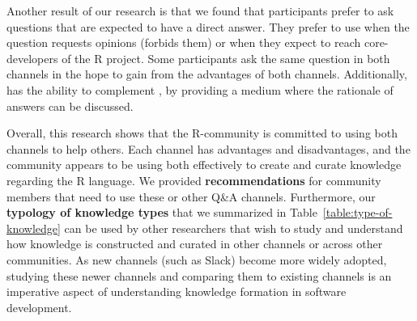 Another result of our research is that we found that participants prefer \SO to ask questions that are expected to have a direct answer. They prefer to use \RH when the
question requests opinions (\SO forbids them) or when they expect to reach core-developers of the R project. Some participants ask the same question in both
channels in the hope to gain from the advantages of both channels. Additionally, \RH has the ability to complement \SO, by providing a medium where the rationale
of answers can be discussed.

Overall, this research shows that the R-community is committed to using both channels to help others. Each channel has advantages and disadvantages, and the
community appears to be using both effectively to create and curate knowledge regarding the R language.  We provided \textbf{recommendations} for community members that need to use these or other Q\&A channels.  Furthermore, our \textbf{typology of knowledge types} that we summarized in Table~\ref{table:type-of-knowledge} can be used by other researchers that wish to study and understand how knowledge is constructed and curated in other channels or across other communities.  As new channels (such as Slack) become more widely adopted, studying these newer channels and comparing them to existing channels is an imperative aspect of understanding knowledge formation in software development. %








